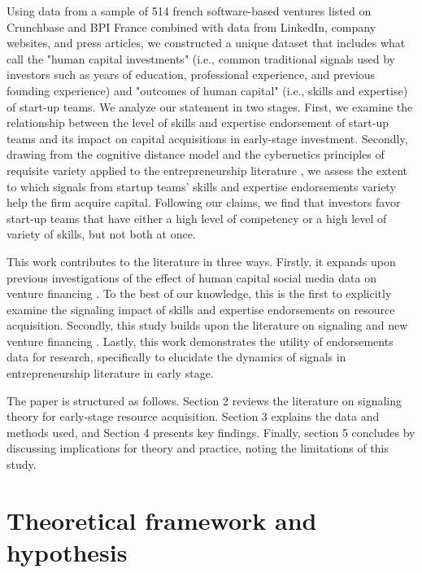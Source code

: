 \documentclass[12pt]{article}
\begin{document}
Using data from a sample of 514 french software-based ventures listed on Crunchbase and BPI France combined with data from LinkedIn, company websites, and press articles, we constructed a unique dataset that includes what \citet{marvel2016human} call the "human capital investments" (i.e., common traditional signals used by investors such as years of education, professional experience, and previous founding experience) and "outcomes of human capital" (i.e., skills and expertise) of start-up teams. We analyze our statement in two stages. First, we examine the relationship between the level of skills and expertise endorsement of start-up teams and its impact on capital acquisitions in early-stage investment. Secondly, drawing from the cognitive distance model \citep{nooteboom2007optimal} and the cybernetics principles of requisite variety applied to the entrepreneurship literature \citep{ashby1957introduction, harrison2007s}, we assess the extent to which signals from startup teams' skills and expertise endorsements variety help the firm acquire capital. Following our claims, we find that investors favor start-up teams that have either a high level of competency or a high level of variety of skills, but not both at once.

This work contributes to the literature in three ways. Firstly, it expands upon previous investigations of the effect of human capital social media data on venture financing \citep{banerji2019startup, marvel2016human, mollick2014dynamics, reese2020should}. To the best of our knowledge, this is the first to explicitly examine the signaling impact of skills and expertise endorsements on resource acquisition. Secondly, this study builds upon the literature on signaling and new venture financing \citep{colombo2021use, drover2017review, klein2020start}. Lastly, this work demonstrates the utility of endorsements data for research, specifically to elucidate the dynamics of signals in entrepreneurship literature in early stage.

The paper is structured as follows. Section 2 reviews the literature on signaling theory for early-stage resource acquisition. Section 3 explains the data and methods used, and Section 4 presents key findings. Finally, section 5 concludes by discussing implications for theory and practice, noting the limitations of this study.

\section{Theoretical framework and hypothesis}
\end{document}
